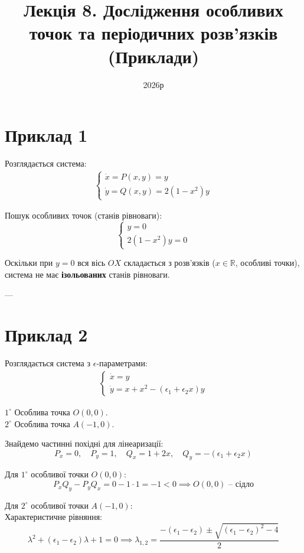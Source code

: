 \documentclass[11pt, a4paper]{article}
\title{\textbf{Лекція 8. Дослідження особливих точок та періодичних розв'язків \\ (Приклади)}}
\author{}
\date{2026р}
\begin{document}
\maketitle

\section*{Приклад 1}
Розглядається система:
\begin{gather*}
\begin{cases}
\dot{x} = P(x,y) = y \\
\dot{y} = Q(x,y) = 2(1 - x^2)y
\end{cases}
\end{gather*}

Пошук особливих точок (станів рівноваги):
$$\begin{cases} y = 0 \\ 2(1 - x^2)y = 0 \end{cases}$$

Оскільки при $y = 0$ вся вісь $OX$ складається з розв'язків ($x \in \mathbb{R}$, особливі точки), система не має \textbf{ізольованих} станів рівноваги.

---

\section*{Приклад 2}
Розглядається система з $\epsilon$-параметрами:
\begin{gather*}
\begin{cases}
\dot{x} = y \\
\dot{y} = x + x^2 - (\epsilon_1 + \epsilon_2 x)y
\end{cases}
\end{gather*}

$1^{\circ}$ Особлива точка $O(0,0)$. \\
$2^{\circ}$ Особлива точка $A(-1, 0)$.

Знайдемо частинні похідні для лінеаризації:
$$P_x = 0, \quad P_y = 1, \quad Q_x = 1 + 2x, \quad Q_y = -(\epsilon_1 + \epsilon_2 x)$$

Для $1^{\circ}$ особливої точки $O(0,0)$:
$$P_x Q_y - P_y Q_x = 0 - 1 \cdot 1 = -1 < 0 \implies O(0,0) \text{ -- сідло}$$

Для $2^{\circ}$ особливої точки $A(-1,0)$: \\
Характеристичне рівняння:
$$\lambda^2 + (\epsilon_1 - \epsilon_2)\lambda + 1 = 0 \implies \lambda_{1,2} = \frac{-(\epsilon_1 - \epsilon_2) \pm \sqrt{(\epsilon_1 - \epsilon_2)^2 - 4}}{2}$$
\end{document}
